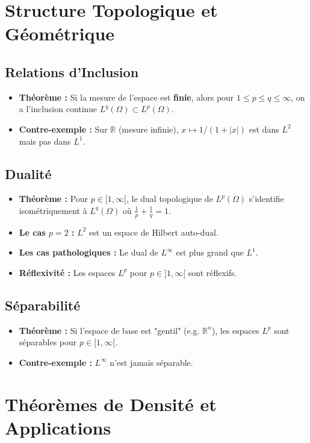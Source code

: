 \documentclass[12pt, a4paper, parskip=full]{report}
\theoremstyle{agregstyle}
\begin{document}
\section{Structure Topologique et Géométrique}
\subsection{Relations d'Inclusion}
\begin{itemize}
    \item \textbf{Théorème :} Si la mesure de l'espace est \textbf{finie}, alors pour $1 \le p \le q \le \infty$, on a l'inclusion continue $L^q(\Omega) \subset L^p(\Omega)$.
    \item \textbf{Contre-exemple :} Sur $\mathbb{R}$ (mesure infinie), $x \mapsto 1/(1+|x|)$ est dans $L^2$ mais pas dans $L^1$.
\end{itemize}
\subsection{Dualité}
\begin{itemize}
    \item \textbf{Théorème :} Pour $p \in [1, \infty[$, le dual topologique de $L^p(\Omega)$ s'identifie isométriquement à $L^q(\Omega)$ où $\frac{1}{p}+\frac{1}{q}=1$.
    \item \textbf{Le cas $p=2$ :} $L^2$ est un espace de Hilbert auto-dual.
    \item \textbf{Les cas pathologiques :} Le dual de $L^\infty$ est plus grand que $L^1$.
    \item \textbf{Réflexivité :} Les espaces $L^p$ pour $p \in ]1,\infty[$ sont réflexifs.
\end{itemize}
\subsection{Séparabilité}
\begin{itemize}
    \item \textbf{Théorème :} Si l'espace de base est "gentil" (e.g. $\mathbb{R}^n$), les espaces $L^p$ sont séparables pour $p \in [1, \infty[$.
    \item \textbf{Contre-exemple :} $L^\infty$ n'est jamais séparable.
\end{itemize}

\section{Théorèmes de Densité et Applications}
\end{document}
